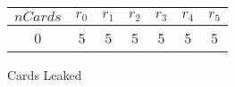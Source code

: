 \begin{minipage}{0.5\linewidth}
\begin{tabular}{ | c || c | c | c | c | c | c  | } 
 \hline 
$nCards$  & $r_{0}$ & $r_{1}$ & $r_{2}$ & $r_{3}$ & $r_{4}$ & $r_{5}$ \\ 
 \hline 
0 & 5 & 5 & 5 & 5 & 5 & 5 \\ 
\hline
\end{tabular}
  \caption{Cards Leaked}
  \label{cLeaked-0}
\end{minipage}
